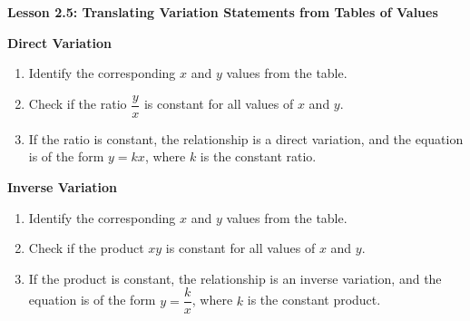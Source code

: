   \begin{center}
\textbf{Lesson 2.5: Translating Variation Statements from Tables of Values}
\end{center}

\vspace*{-1.5ex}

\noindent\textbf{Direct Variation}
\begin{enumerate}
    \item Identify the corresponding $x$ and $y$ values from the table.
    \item Check if the ratio $\dfrac{y}{x}$ is constant for all values of $x$ and $y$.
    \item If the ratio is constant, the relationship is a direct variation, and the equation is of the form $y = kx$, where $k$ is the constant ratio.
\end{enumerate}

\noindent\textbf{Inverse Variation}
\begin{enumerate}
    \item Identify the corresponding $x$ and $y$ values from the table.
    \item Check if the product $xy$ is constant for all values of $x$ and $y$.
    \item If the product is constant, the relationship is an inverse variation, and the equation is of the form $y = \dfrac{k}{x}$, where $k$ is the constant product.
\end{enumerate}

